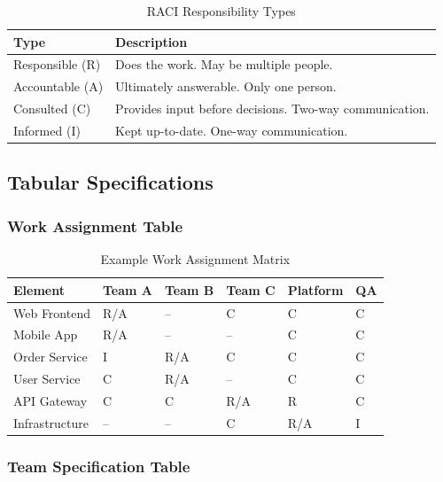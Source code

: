 \documentclass[11pt,letterpaper]{article}
\begin{document}
\begin{table}[H]
\centering
\caption{RACI Responsibility Types}
\small
\begin{tabular}{@{}L{2.5cm}L{10cm}@{}}
\toprule
\textbf{Type} & \textbf{Description} \\
\midrule
Responsible (R) & Does the work. May be multiple people. \\
\addlinespace
Accountable (A) & Ultimately answerable. Only one person. \\
\addlinespace
Consulted (C) & Provides input before decisions. Two-way communication. \\
\addlinespace
Informed (I) & Kept up-to-date. One-way communication. \\
\bottomrule
\end{tabular}
\end{table}

\subsection{Tabular Specifications}

\subsubsection{Work Assignment Table}

\begin{table}[H]
\centering
\caption{Example Work Assignment Matrix}
\small
\begin{tabular}{@{}L{2.5cm}C{1.5cm}C{1.5cm}C{1.5cm}C{1.5cm}C{1.5cm}@{}}
\toprule
\textbf{Element} & \textbf{Team A} & \textbf{Team B} & \textbf{Team C} & \textbf{Plat\-form} & \textbf{QA} \\
\midrule
Web Frontend & R/A & -- & C & C & C \\
Mobile App & R/A & -- & -- & C & C \\
Order Service & I & R/A & C & C & C \\
User Service & C & R/A & -- & C & C \\
API Gateway & C & C & R/A & R & C \\
Infrastructure & -- & -- & C & R/A & I \\
\bottomrule
\end{tabular}
\end{table}

\subsubsection{Team Specification Table}
\end{document}
